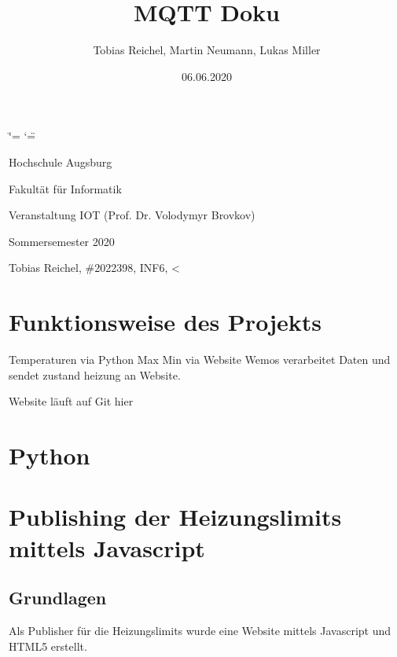 \documentclass[a4paper,11pt,openany,oneside,ngerman]{sphinxmanual}
\title{MQTT Doku}
\date{06.06.2020}
\author{Tobias Reichel, Martin Neumann, Lukas Miller}
\begin{document}
\ifdefined\shorthandoff
  \ifnum\catcode`\=\string=\active\shorthandoff{=}\fi
  \ifnum\catcode`\"=\active{}\fi
\fi

\pagestyle{empty}
\sphinxmaketitle
\pagestyle{plain}
\sphinxtableofcontents
\pagestyle{normal}
\label{\detokenize{index::doc}}


\begin{DUlineblock}{0em}
\item[] Hochschule Augsburg
\item[] Fakultät für Informatik
\item[] Veranstaltung IOT (Prof. Dr. Volodymyr Brovkov)
\item[] Sommersemester 2020
\end{DUlineblock}


\begin{DUlineblock}{0em}
\item[] Tobias Reichel, \#2022398, INF6, \textless{}
\end{DUlineblock}


\chapter{Funktionsweise des Projekts}
\label{\detokenize{einleitung:funktionsweise-des-projekts}}\label{\detokenize{einleitung::doc}}
Temperaturen via Python
Max Min via Website
Wemos verarbeitet Daten und sendet zustand heizung an Website.

Website läuft auf 
Git hier 


\chapter{Python}
\label{\detokenize{python:python}}\label{\detokenize{python::doc}}

\chapter{Publishing der Heizungslimits mittels Javascript}
\label{\detokenize{webpage:publishing-der-heizungslimits-mittels-javascript}}\label{\detokenize{webpage::doc}}

\section{Grundlagen}
\label{\detokenize{webpage:grundlagen}}
Als Publisher für die Heizungslimits wurde eine Website mittels Javascript und
HTML5 erstellt.
\end{document}
